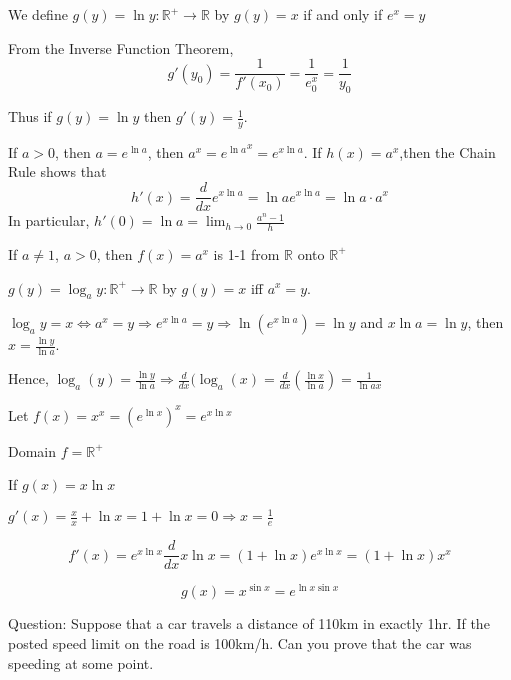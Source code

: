 \begin{defn}
    We define $g(y) = \ln y: \mathbb{R}^+ \to \mathbb{R}$ by $g(y) = x$ if and only if $e^x =y$
\end{defn}

From the Inverse Function Theorem, \[g'(y_0) = \frac{1}{f'(x_0)} = \frac{1}{e^x_0} = \frac{1}{y_0}\]

Thus if $g(y) = \ln y$ then $g'(y) = \frac{1}{y}$.

\begin{note}
    If $a>0$, then $a = e^{\ln a}$, then $a^x = {e^{\ln a}}^{x} = e^{x\ln a }$. If $h(x) = a^x$,then the Chain Rule shows that 
    \[h'(x) = \frac{d}{dx}e^{x\ln a } = \ln a e^{x\ln a } = \ln a \cdot a^x\]
     In particular, $\displaystyle h'(0) = \ln a = \lim_{h \to 0}\frac{a^n - 1}{h}$
     \begin{note}
         If $a \neq 1$, $a> 0$, then $f(x) = a^x$ is 1-1 from $\mathbb{R}$ onto $\mathbb{R}^+$
     \end{note}
\end{note}

\begin{defn}
    $g(y) = \log_ay: \mathbb{R}^+ \to \mathbb{R}$ by $g(y) = x $ iff $a^x = y$.
    
    $\log_ay = x \Leftrightarrow a^x = y \Rightarrow e^{x\ln a} = y \Rightarrow \ln (e^{x{\ln a}}) = \ln y$ and $x\ln a = \ln y$, then $x = \frac{\ln y}{\ln a}$.
    
    Hence, $\displaystyle \log_a(y) = \frac{\ln y}{\ln a} \Rightarrow \frac{d}{dx} (\log_a (x) = \frac{d}{dx} (\frac{\ln x}{\ln a}) = \frac{1}{\ln ax}$
\end{defn}

\begin{exmp} 
    
Let $f(x) = x^x = (e^{\ln x})^x = e^{x\ln x}$

Domain $f = \mathbb{R}^+$
\begin{note}
    If $g(x) = x\ln x$
    
    $g'(x) = \frac{x}{x} + \ln x = 1 + \ln x = 0 \Rightarrow x = \frac{1}{e}$
\end{note}
\[f'(x) = e^{x\ln x} \frac{d}{dx} x\ln x = (1+\ln x) e^{x\ln x} = (1+\ln x) x^x\]
\end{exmp}

\begin{exmp}
    \[g(x) = x^{\sin x} = e^{\ln x \sin x}\]
\end{exmp}

\begin{exmp}
    Question: Suppose that a car travels a distance of 110km in exactly 1hr. If the posted speed limit on the road is 100km/h. Can you prove that the car was speeding at some point.
\end{exmp}